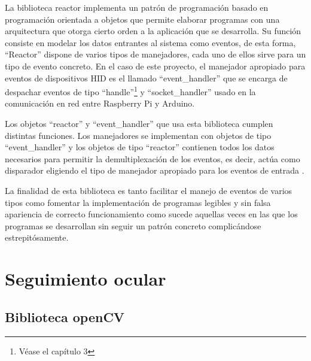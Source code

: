 La biblioteca reactor implementa un patrón de programación basado en programación orientada a objetos que permite elaborar programas con una arquitectura que otorga cierto orden a la aplicación que se desarrolla. Su función consiste en modelar los datos entrantes al sistema como eventos, de esta forma, ``Reactor'' dispone de varios tipos de manejadores, cada uno de ellos sirve para un tipo de evento concreto. En el caso de este proyecto, el manejador apropiado para eventos de dispositivos HID es el llamado ``event\_handler'' que se encarga de despachar eventos de tipo ``handle''\footnote{Véase el capítulo 3} y ``socket\_handler'' usado en la comunicación en red entre Raspberry Pi y Arduino. 

Los objetos ``reactor'' y ``event\_handler'' que usa esta biblioteca cumplen distintas funciones. Los manejadores se implementan con objetos de tipo ``event\_handler'' y los objetos de tipo ``reactor'' contienen todos los datos necesarios para permitir la demultiplexación de los eventos, es decir, actúa como disparador eligiendo el tipo de manejador apropiado para los eventos de entrada \citep[pág. 97--100]{tallerRPi}.

La finalidad de esta biblioteca es tanto facilitar el manejo de eventos de varios tipos como fomentar la implementación de programas legibles y sin falsa apariencia de correcto funcionamiento como sucede aquellas veces en las que los programas se desarrollan sin seguir un patrón concreto complicándose estrepitósamente.













\newpage
\section{Seguimiento ocular} \label{s2_2}

\subsection{Biblioteca openCV} \label{s2_2_1}

